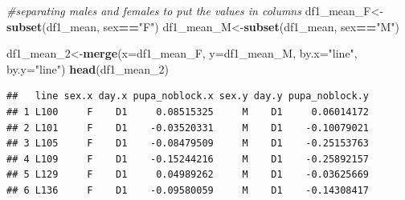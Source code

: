 \documentclass[
]{article}
\newenvironment{Shaded}{\begin{snugshade}}{\end{snugshade}}
\newcommand{\CommentTok}[1]{\textcolor[rgb]{0.56,0.35,0.01}{\textit{#1}}}
\newcommand{\DataTypeTok}[1]{\textcolor[rgb]{0.13,0.29,0.53}{#1}}
\newcommand{\DecValTok}[1]{\textcolor[rgb]{0.00,0.00,0.81}{#1}}
\newcommand{\KeywordTok}[1]{\textcolor[rgb]{0.13,0.29,0.53}{\textbf{#1}}}
\newcommand{\NormalTok}[1]{#1}
\newcommand{\OperatorTok}[1]{\textcolor[rgb]{0.81,0.36,0.00}{\textbf{#1}}}
\newcommand{\StringTok}[1]{\textcolor[rgb]{0.31,0.60,0.02}{#1}}
\begin{document}
\begin{Shaded}
\begin{Highlighting}[]
\CommentTok{#separating males and females to put the values in columns}
\NormalTok{df1_mean_F<-}\KeywordTok{subset}\NormalTok{(df1_mean, sex}\OperatorTok{==}\StringTok{"F"}\NormalTok{)}
\NormalTok{df1_mean_M<-}\KeywordTok{subset}\NormalTok{(df1_mean, sex}\OperatorTok{==}\StringTok{"M"}\NormalTok{)}

\NormalTok{df1_mean_}\DecValTok{2}\NormalTok{<-}\KeywordTok{merge}\NormalTok{(}\DataTypeTok{x=}\NormalTok{df1_mean_F, }\DataTypeTok{y=}\NormalTok{df1_mean_M, }\DataTypeTok{by.x=}\StringTok{"line"}\NormalTok{, }\DataTypeTok{by.y=}\StringTok{"line"}\NormalTok{)}
\KeywordTok{head}\NormalTok{(df1_mean_}\DecValTok{2}\NormalTok{)}
\end{Highlighting}
\end{Shaded}

\begin{verbatim}
##   line sex.x day.x pupa_noblock.x sex.y day.y pupa_noblock.y
## 1 L100     F    D1     0.08515325     M    D1     0.06014172
## 2 L101     F    D1    -0.03520331     M    D1    -0.10079021
## 3 L105     F    D1    -0.08479509     M    D1    -0.25153763
## 4 L109     F    D1    -0.15244216     M    D1    -0.25892157
## 5 L129     F    D1     0.04989262     M    D1    -0.03625669
## 6 L136     F    D1    -0.09580059     M    D1    -0.14308417
\end{verbatim}

\begin{Shaded}
\end{Shaded}
\end{document}
